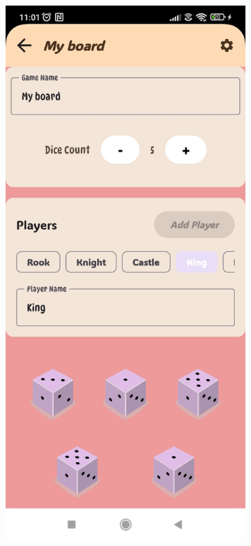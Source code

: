 \begin{figure}[ht!]
    \centering
    \begin{subfigure}[b]{0.26\textwidth}
        \includegraphics[width=\textwidth]{img/custom game2.jpg}

\end{subfigure}
\end{figure}
